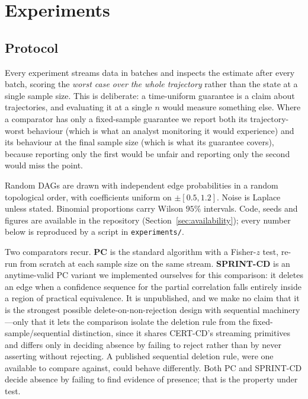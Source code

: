 
\section{Experiments}\label{sec:experiments}

\subsection{Protocol}\label{sec:protocol}

Every experiment streams data in batches and inspects the estimate after every
batch, scoring the \emph{worst case over the whole trajectory} rather than the
state at a single sample size. This is deliberate: a time-uniform guarantee is
a claim about trajectories, and evaluating it at a single $n$ would measure
something else. Where a comparator has only a fixed-sample guarantee we report
both its trajectory-worst behaviour (which is what an analyst monitoring it
would experience) and its behaviour at the final sample size (which is what
its guarantee covers), because reporting only the first would be unfair and
reporting only the second would miss the point.

Random DAGs are drawn with independent edge probabilities in a random
topological order, with coefficients uniform on $\pm[0.5, 1.2]$. Noise is
Laplace unless stated. Binomial proportions carry Wilson $95\%$ intervals.
Code, seeds and figures are available in the repository
(Section~\ref{sec:availability}); every number below is reproduced by a
script in \texttt{experiments/}.

Two comparators recur. \textbf{PC} is the standard algorithm with a Fisher-$z$
test, re-run from scratch at each sample size on the same stream.
\textbf{SPRINT-CD} is an anytime-valid PC variant we implemented ourselves for
this comparison: it deletes an edge when a confidence sequence for the partial
correlation falls entirely inside a region of practical equivalence. It is
unpublished, and we make no claim that it is the strongest possible
delete-on-non-rejection design with sequential machinery---only that it lets
the comparison isolate the deletion rule from the fixed-sample/sequential
distinction, since it shares CERT-CD's streaming primitives and differs only
in deciding absence by failing to reject rather than by never asserting
without rejecting. A published sequential deletion rule, were one available to
compare against, could behave differently. Both PC and SPRINT-CD decide
absence by failing to find evidence of presence; that is the property under
test.

